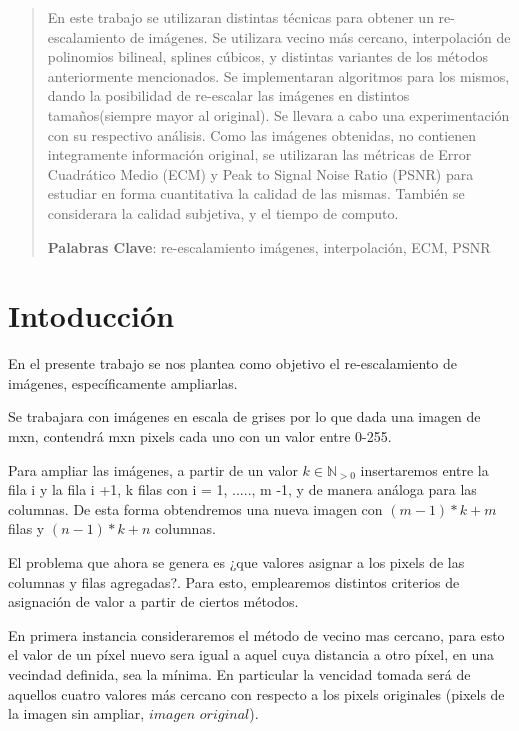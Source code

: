 \documentclass[a4paper]{article}
\newcounter{col}
\begin{document}
\setcounter{page}{1}
\renewcommand{\tablename}{Tabla} 


\begin{abstract}

En este trabajo se utilizaran distintas técnicas para obtener un re-escalamiento de imágenes. Se utilizara vecino más cercano, interpolación de polinomios bilineal, splines cúbicos, y distintas variantes de los métodos anteriormente mencionados. Se implementaran algoritmos para los mismos, dando la posibilidad de re-escalar las imágenes en distintos tamaños(siempre mayor al original). Se llevara a cabo una experimentación con su respectivo análisis. Como las imágenes obtenidas, no contienen integramente información original, se utilizaran las métricas de Error Cuadrático Medio (ECM) y Peak to Signal Noise Ratio (PSNR) para estudiar en forma cuantitativa la calidad de las mismas. También se considerara la calidad subjetiva, y el tiempo de computo. 

\textbf{Palabras Clave}: re-escalamiento imágenes, interpolación, ECM, PSNR

\end{abstract}

\newpage

\section{Intoducción}

En el presente trabajo se nos plantea como objetivo el re-escalamiento de imágenes, específicamente ampliarlas.

Se trabajara con imágenes en escala de grises por lo que dada una imagen de mxn, contendrá mxn pixels cada uno con un valor entre 0-255.

Para ampliar las imágenes, a partir de un valor $k \in \mathbb{N}_{>0}$ insertaremos entre la fila i y la fila i +1, k filas con i = 1, ....., m -1, y de manera análoga para las columnas. De esta forma obtendremos una nueva imagen con $(m -1)*k + m$ filas y $(n -1)*k + n$ columnas.

El problema que ahora se genera es ¿que valores asignar a los pixels de las columnas y filas agregadas?. Para esto, emplearemos distintos criterios de asignación de valor a partir de ciertos métodos.

En primera instancia consideraremos el método de vecino mas cercano, para esto el valor de un píxel nuevo sera igual a aquel cuya distancia a otro píxel, en una vecindad definida, sea la mínima. En particular la vencidad tomada será de aquellos cuatro valores más cercano con respecto a los pixels originales (pixels de la imagen sin ampliar, $imagen$ $original$). 
\end{document}
